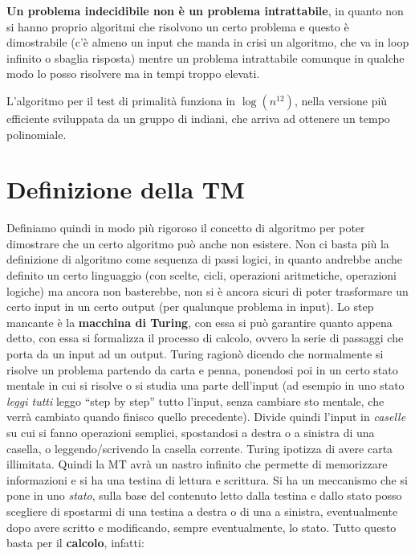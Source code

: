 \documentclass[a4paper,12pt, oneside]{book}
\begin{document}
\textbf{Un problema indecidibile non è un problema intrattabile}, in quanto non
si hanno proprio algoritmi che risolvono un certo problema e questo è
dimostrabile (c'è almeno un input che manda in crisi un algoritmo, che va in
loop infinito o sbaglia risposta) mentre un problema intrattabile comunque in
qualche modo lo posso risolvere ma in tempi troppo elevati.
\begin{shaded}
  L'algoritmo per il test di primalità funziona in $\log (n^{12})$, nella
  versione più efficiente sviluppata da un gruppo di indiani, che arriva ad
  ottenere un tempo polinomiale.
\end{shaded}
\section{Definizione della TM}
Definiamo quindi in modo più rigoroso il concetto di algoritmo per poter
dimostrare che un certo algoritmo può anche non esistere. Non ci basta più la
definizione di algoritmo come sequenza di passi logici, in quanto andrebbe anche
definito un certo linguaggio (con scelte, cicli, operazioni aritmetiche,
operazioni logiche) ma ancora non basterebbe, non si è ancora sicuri di poter
trasformare un certo input in un certo output (per qualunque problema in
input). Lo step mancante è la \textbf{macchina di Turing}, con essa si può
garantire quanto appena detto, con essa si formalizza il processo di calcolo,
ovvero la serie di passaggi che porta da un input ad un output. Turing ragionò
dicendo che normalmente si risolve un problema partendo da carta e penna,
ponendosi poi in un certo stato mentale in cui si risolve o si studia una parte
dell'input (ad esempio in uno stato \textit{leggi tutti} leggo ``step by step''
tutto l'input, senza cambiare sto mentale, che verrà cambiato quando finisco
quello precedente). Divide quindi l'input in \textit{caselle} su cui si fanno
operazioni semplici, spostandosi a destra o a sinistra di una casella, o
leggendo/scrivendo la casella corrente. Turing ipotizza di avere carta
illimitata. Quindi la MT avrà un nastro infinito che permette di memorizzare
informazioni e si ha una testina di lettura e scrittura. Si ha un meccanismo che
si pone in uno \textit{stato}, sulla base del contenuto letto dalla testina e
dallo stato posso scegliere di spostarmi di una testina a destra o di una a
sinistra, eventualmente dopo avere scritto e modificando, sempre eventualmente,
lo stato. Tutto questo basta per il \textbf{calcolo}, infatti:
\end{document}
